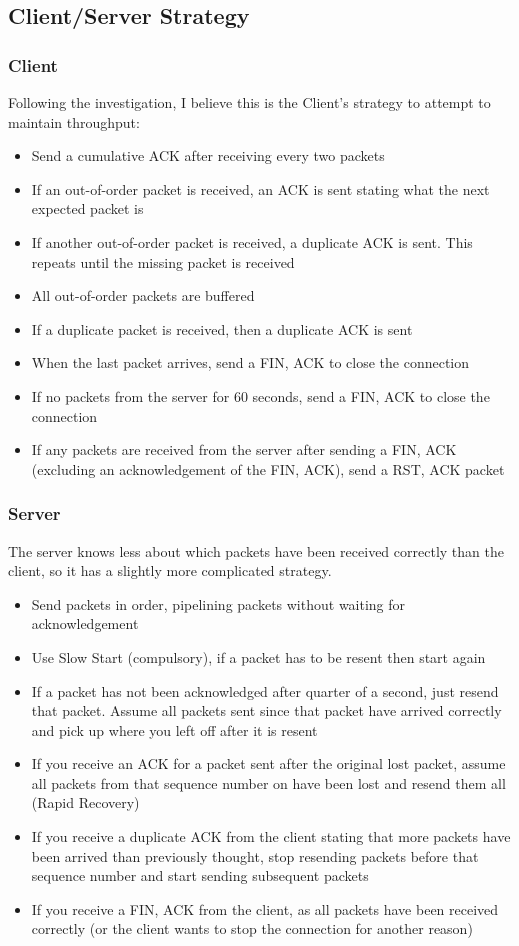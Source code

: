 \documentclass[12pt]{article}
\begin{document}
\subsection*{Client/Server Strategy}
\subsubsection*{Client}
Following the investigation, I believe this is the Client's strategy to attempt to maintain throughput:
\begin{itemize}
  \item Send a cumulative ACK after receiving every two packets
  \item If an out-of-order packet is received, an ACK is sent stating what the next expected packet is
  \item If another out-of-order packet is received, a duplicate ACK is sent. This repeats until the missing packet is received
  \item All out-of-order packets are buffered
  \item If a duplicate packet is received, then a duplicate ACK is sent
  \item When the last packet arrives, send a FIN, ACK to close the connection
  \item If no packets from the server for 60 seconds, send a FIN, ACK to close the connection
  \item If any packets are received from the server after sending a FIN, ACK (excluding an acknowledgement of the FIN, ACK), send a RST, ACK packet
\end{itemize}

\subsubsection*{Server}
The server knows less about which packets have been received correctly than the client, so it has a slightly more complicated strategy.
\begin{itemize}
  \item Send packets in order, pipelining packets without waiting for acknowledgement
  \item Use Slow Start (compulsory), if a packet has to be resent then start again
  \item If a packet has not been acknowledged after quarter of a second, just resend that packet. Assume all packets sent since that packet have arrived correctly and pick up where you left off after it is resent
  \item If you receive an ACK for a packet sent after the original lost packet, assume all packets from that sequence number on have been lost and resend them all (Rapid Recovery)
  \item If you receive a duplicate ACK from the client stating that more packets have been arrived than previously thought, stop resending packets before that sequence number and start sending subsequent packets
  \item If you receive a FIN, ACK from the client, as all packets have been received correctly (or the client wants to stop the connection for another reason)
\end{itemize}
\end{document}
